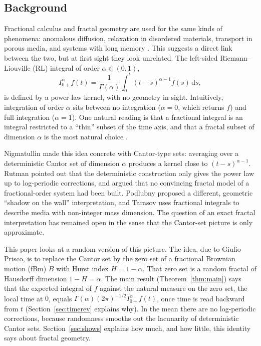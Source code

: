 \documentclass[11pt]{article}
\theoremstyle{remark}
\theoremstyle{definition}
\newcommand{\dd}{\,\mathrm{d}}
\newcommand{\Ia}{I^{\alpha}_{0+}}
\begin{document}
\subsection{Background}\label{sec:background}
Fractional calculus and fractal geometry are used for the same kinds of phenomena: anomalous diffusion, relaxation in disordered materials, transport in porous media, and systems with long memory \cite{Pod99,Tar10,MS12}. This suggests a direct link between the two, but at first sight they look unrelated. The left-sided Riemann--Liouville (RL) integral of order $\alpha\in(0,1)$,
\begin{equation}\label{eq:RL}
\Ia f(t)=\frac{1}{\Gamma(\alpha)}\int_0^t (t-s)^{\alpha-1}f(s)\dd s,
\end{equation}
is defined by a power-law kernel, with no geometry in sight. Intuitively, integration of order $\alpha$ sits between no integration ($\alpha=0$, which returns $f$) and full integration ($\alpha=1$). One natural reading is that a fractional integral is an integral restricted to a ``thin'' subset of the time axis, and that a fractal subset of dimension $\alpha$ is the most natural choice \cite{Nig92}.

Nigmatullin \cite{Nig92} made this idea concrete with Cantor-type sets: averaging over a deterministic Cantor set of dimension $\alpha$ produces a kernel close to $(t-s)^{\alpha-1}$. Rutman \cite{Rut94,Rut95} pointed out that the deterministic construction only gives the power law up to log-periodic corrections, and argued that no convincing fractal model of a fractional-order system had been built. Podlubny \cite{Pod02} proposed a different, geometric ``shadow on the wall'' interpretation, and Tarasov \cite{Tar10} uses fractional integrals to describe media with non-integer mass dimension. The question of an exact fractal interpretation has remained open in the sense that the Cantor-set picture is only approximate.

This paper looks at a random version of this picture. The idea, due to Giulio Prisco, is to replace the Cantor set by the zero set of a fractional Brownian motion (fBm) $B$ with Hurst index $H=1-\alpha$. That zero set is a random fractal of Hausdorff dimension $1-H=\alpha$. The main result (Theorem~\ref{thm:main}) says that the expected integral of $f$ against the natural measure on the zero set, the local time at $0$, equals $\Gamma(\alpha)(2\pi)^{-1/2}\Ia f(t)$, once time is read backward from $t$ (Section~\ref{sec:timerev} explains why). In the mean there are no log-periodic corrections, because randomness smooths out the lacunarity of deterministic Cantor sets. Section~\ref{sec:shows} explains how much, and how little, this identity says about fractal geometry.
\end{document}
